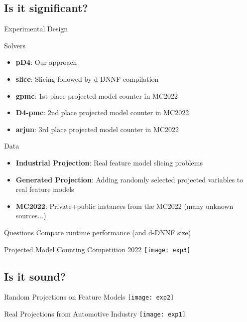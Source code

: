 \documentclass[
	aspectratio=169, %
	8pt, %
]{beamer}
\begin{document}
\subsection{Is it significant?}
\begin{frame}{\insertsubsection\hfill{}Experimental Design}
	\begin{block}{Solvers}
		\begin{itemize}
			\item {\bf pD4}: Our approach
			\item {\bf slice}: Slicing followed by d-DNNF compilation
			\item {\bf gpmc}: 1st place projected model counter in MC2022
			\item {\bf D4-pmc}: 2nd place projected model counter in MC2022
			\item {\bf arjun}: 3rd place projected model counter in MC2022
		\end{itemize}
	\end{block}
	\begin{block}{Data}
		\begin{itemize}
			\item {\bf Industrial Projection}: Real feature model slicing problems
			\item {\bf Generated Projection}: Adding randomly selected projected variables to real feature models
			\item {\bf MC2022}: Private+public instances from the MC2022 (many unknown sources...)
		\end{itemize}
	\end{block}
	\begin{block}{Questions}
		Compare runtime performance (and d-DNNF size)
	\end{block}
\end{frame}

\begin{frame}{\insertsubsection\hfill{}Projected Model Counting Competition 2022}
	\texttt{[image: exp3]}
\end{frame}

\subsection{Is it sound?}
\begin{frame}{\insertsubsection\hfill{}Random Projections on Feature Models}
	\centering\texttt{[image: exp2]}
\end{frame}
\begin{frame}{\insertsubsection\hfill{}Real Projections from Automotive Industry}
	\centering\texttt{[image: exp1]}
\end{frame}
\end{document}
